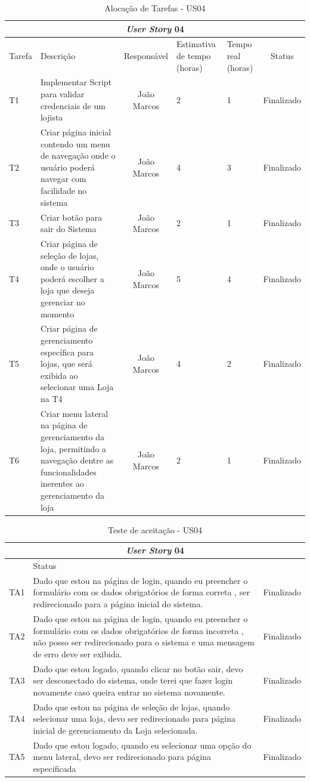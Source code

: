 \documentclass[a4paper,12pt]{monografia}
\begin{document}
\begin{longtable}{|p{1.5cm}|p{3.5cm}|c|p{2cm}|p{2cm}|c|}
\caption{Alocação de Tarefas - US04}
\label{quadro:tat-us04}
\hline
\multicolumn{6}{|c|}{\textbf{\textit{User Story} 04}}\\
\hline		
\rowcolor{ballblue}
Tarefa & Descrição & Responsável & Estimativa de tempo (horas) & Tempo real (horas) & Status\\
\hline
T1 & Implementar Script para validar credenciais de um lojista & João Marcos & 2 & 1 & Finalizado\\
\hline
T2 & Criar página inicial contendo um menu de navegação onde o usuário poderá navegar com facilidade no sistema & João Marcos & 4 & 3 & Finalizado\\
\hline
T3 & Criar botão para sair do Sistema & João Marcos & 2 & 1 & Finalizado\\
\hline
T4 & Criar página de seleção de lojas, onde o usuário poderá escolher a loja que deseja gerenciar no momento & João Marcos & 5 & 4 & Finalizado\\
\hline
T5 & Criar página de gerenciamento específica para lojas, que será exibida ao selecionar uma Loja na T4 & João Marcos & 4 & 2 & Finalizado\\
\hline
T6 & Criar menu lateral na página de gerenciamento da loja, permitindo a navegação dentre as funcionalidades inerentes ao gerenciamento da loja & João Marcos & 2 & 1 & Finalizado\\
\hline
\end{longtable}

\begin{longtable}{|l|p{11.8cm}|c|}
\caption{Teste de aceitação - US04}
\label{quadro:teste-aceitacao-us04}
\hline
\multicolumn{3}{|c|}{\textbf{\textit{User Story} 04}}\\
\hline		
\rowcolor{ballblue}
\multicolumn{2}{|c|}{Testes de aceitação} & Status\\	
\hline
TA1 & Dado que estou na página de login, quando eu preencher o formulário com os dados obrigatórios de forma correta , ser redirecionado para a página inicial do sistema.   & Finalizado\\
\hline
TA2 & Dado que estou na página de login, quando eu preencher o formulário com os dados obrigatórios de forma incorreta , não posso ser redirecionado para o sistema e uma mensagem de erro deve ser exibida.   & Finalizado\\
\hline
TA3 & Dado que estou logado, quando clicar no botão sair, devo ser desconectado do sistema, onde terei que fazer login novamente caso queira entrar no sistema novamente.   & Finalizado\\
\hline
TA4 & Dado que estou na página de seleção de lojas, quando selecionar uma loja, devo ser redirecionado  para página inicial de gerenciamento da Loja selecionada.  & Finalizado\\
\hline
TA5 & Dado que estou logado, quando eu selecionar uma opção do menu lateral, devo ser redirecionado para página especificada  & Finalizado\\
\hline	
\end{longtable}
\end{document}
